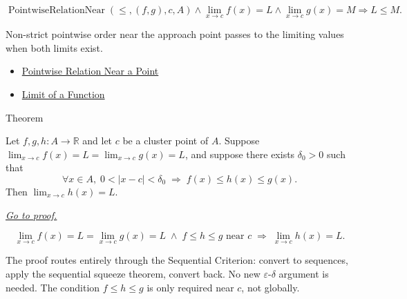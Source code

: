 \begin{remark*}
\[
  \operatorname{PointwiseRelationNear}(\leq,(f,g),c,A)
  \wedge \lim_{x\to c}f(x)=L
  \wedge \lim_{x\to c}g(x)=M
  \Rightarrow L\leq M.
\]
\end{remark*}

\begin{remark*}[Interpretation]
Non-strict pointwise order near the approach point passes to the limiting
values when both limits exist.
\end{remark*}

\begin{dependencies}
\begin{itemize}
  \item \hyperref[def:pointwise-relation-near-point]{Pointwise Relation Near a Point}
  \item \hyperref[def:limit-function]{Limit of a Function}
\end{itemize}
\end{dependencies}


\begin{theorembox}{Theorem}
\begin{theorem}
\label{thm:squeeze-function-limits}
Let $f, g, h : A \to \mathbb{R}$ and let $c$ be a cluster point of
$A$. Suppose $\lim_{x\to c}f(x)=L =
\lim_{x\to c}g(x)=L$, and suppose there exists
$\delta_0 > 0$ such that
\[
  \forall x \in A,\;
  0 < |x - c| < \delta_0
  \;\Rightarrow\;
  f(x) \leq h(x) \leq g(x).
\]
Then $\lim_{x\to c}h(x)=L$.

\smallskip\noindent
\hyperref[prf:squeeze-function-limits]{\textit{Go to proof.}}
\end{theorem}
\end{theorembox}

\begin{remark*}
\[
  \lim_{x\to c}f(x)=L
  = \lim_{x\to c}g(x)=L
  \;\wedge\;
  f \leq h \leq g \text{ near } c
  \;\Rightarrow\;
  \lim_{x\to c}h(x)=L.
\]
\end{remark*}

\begin{remark*}[Interpretation]
The proof routes entirely through the Sequential Criterion: convert
to sequences, apply the sequential squeeze theorem, convert back. No
new $\varepsilon$-$\delta$ argument is needed. The condition
$f \leq h \leq g$ is only required near $c$, not globally.
\end{remark*}

